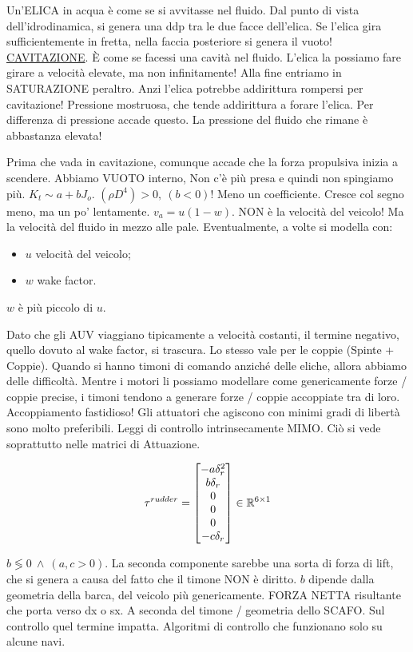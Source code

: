 Un'ELICA in acqua è come se si avvitasse nel fluido. Dal punto di vista dell'idrodinamica, si genera una ddp tra le due facce dell'elica. Se l'elica gira sufficientemente in fretta, nella faccia posteriore si genera il vuoto! \underline{CAVITAZIONE}. \`E come se facessi una cavità nel fluido. L'elica la possiamo fare girare a velocità elevate, ma non infinitamente! Alla fine entriamo in SATURAZIONE peraltro. Anzi l'elica potrebbe addirittura rompersi per cavitazione! Pressione mostruosa, che tende addirittura a forare l'elica. Per differenza di pressione accade questo. La pressione del fluido che rimane è abbastanza elevata!

Prima che vada in cavitazione, comunque accade che la forza propulsiva inizia a scendere. Abbiamo VUOTO interno, Non c'è più presa e quindi non spingiamo più. $K_t\sim a + bJ_o$. $(\rho D^4)>0,\ (b<0)$! Meno un coefficiente. Cresce col segno meno, ma un po' lentamente. $v_a=u(1-w)$. NON è la velocità del veicolo! Ma la velocità del fluido in mezzo alle pale. Eventualmente, a volte si modella con:

\begin{itemize}
\item $u$ velocità del veicolo;
\item $w$ wake factor.
\end{itemize}

$w$ è più piccolo di $u$.

Dato che gli AUV viaggiano tipicamente a velocità costanti, il termine negativo, quello dovuto al wake factor, si trascura. Lo stesso vale per le coppie (Spinte + Coppie). Quando si hanno timoni di comando anziché delle eliche, allora abbiamo delle difficoltà. Mentre i motori li possiamo modellare come genericamente forze / coppie precise, i timoni tendono a generare forze / coppie accoppiate tra di loro. Accoppiamento fastidioso! Gli attuatori che agiscono con minimi gradi di libertà sono molto preferibili. Leggi di controllo intrinsecamente MIMO. Ciò si vede soprattutto nelle matrici di Attuazione.

\[
	\tau^{rudder} = \begin{bmatrix}-a\delta_r^2\\b\delta_r\\0\\0\\0\\-c\delta_r\end{bmatrix}\in\mathbb{R}^{6\times 1}
\]

$b\lessgtr 0\ \land\ (a,c > 0)$. La seconda componente sarebbe una sorta di forza di lift, che si genera a causa del fatto che il timone NON è diritto. $b$ dipende dalla geometria della barca, del veicolo più genericamente. FORZA NETTA risultante che porta verso dx o sx. A seconda del timone / geometria dello SCAFO. Sul controllo quel termine impatta. Algoritmi di controllo che funzionano solo su alcune navi.

